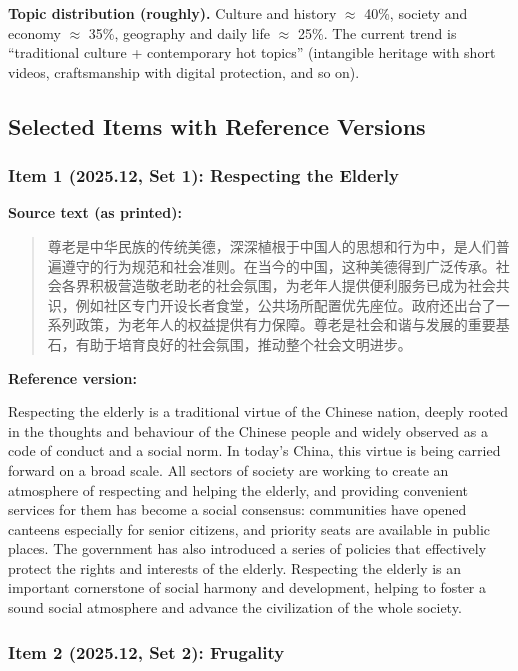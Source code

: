\noindent\textbf{Topic distribution (roughly).}\quad
Culture and history $\approx$ 40\%, society and economy $\approx$ 35\%, geography and daily life $\approx$ 25\%. The current trend is ``traditional culture + contemporary hot topics'' (intangible heritage with short videos, craftsmanship with digital protection, and so on).
\par

\subsection{Selected Items with Reference Versions}

\subsubsection*{Item 1 (2025.12, Set 1): Respecting the Elderly}

\noindent\textbf{Source text (as printed):}
\begin{quote}
尊老是中华民族的传统美德，深深植根于中国人的思想和行为中，是人们普遍遵守的行为规范和社会准则。在当今的中国，这种美德得到广泛传承。社会各界积极营造敬老助老的社会氛围，为老年人提供便利服务已成为社会共识，例如社区专门开设长者食堂，公共场所配置优先座位。政府还出台了一系列政策，为老年人的权益提供有力保障。尊老是社会和谐与发展的重要基石，有助于培育良好的社会氛围，推动整个社会文明进步。
\end{quote}

\noindent\textbf{Reference version:}
\par\smallskip
\noindent Respecting the elderly is a traditional virtue of the Chinese nation, deeply rooted in the thoughts and behaviour of the Chinese people and widely observed as a code of conduct and a social norm. In today's China, this virtue is being carried forward on a broad scale. All sectors of society are working to create an atmosphere of respecting and helping the elderly, and providing convenient services for them has become a social consensus: communities have opened canteens especially for senior citizens, and priority seats are available in public places. The government has also introduced a series of policies that effectively protect the rights and interests of the elderly. Respecting the elderly is an important cornerstone of social harmony and development, helping to foster a sound social atmosphere and advance the civilization of the whole society.
\par\medskip

\subsubsection*{Item 2 (2025.12, Set 2): Frugality}

